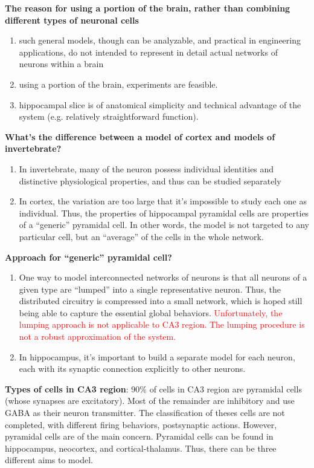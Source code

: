 {\bf The reason for using a portion of the brain, rather than
  combining different types of neuronal cells}
\begin{enumerate}
\item such general models, though can be analyzable, and practical in
  engineering applications, do not intended to represent in detail
  actual networks of neurons within a brain
\item using a portion of the brain, experiments are feasible. 
\item hippocampal slice is of anatomical simplicity and technical
  advantage of the system (e.g. relatively straightforward function).
\end{enumerate}

{\bf What's the difference between a model of cortex and models of
invertebrate?}
\begin{enumerate}
\item In invertebrate, many of the neuron possess individual
  identities and distinctive physiological properties, and thus can be
  studied separately 
\item In cortex, the variation are too large that it's impossible to
  study each one as individual. Thus, the properties of hippocampal
  pyramidal cells are properties of a ``generic'' pyramidal cell. In
  other words, the model is not targeted to any particular cell, but
  an ``average'' of the cells in the whole network. 
\end{enumerate}

{\bf Approach for ``generic'' pyramidal cell?}
\begin{enumerate}
\item One way to model interconnected networks of neurons is that all
  neurons of a given type are ``lumped'' into a single representative
  neuron. Thus, the distributed circuitry is compressed into a small
  network, which is hoped still being able to capture the essential
  global behaviors.
  \textcolor{red}{Unfortunately, the lumping approach is not
    applicable to CA3 region. The lumping procedure is not a robust
    approximation of the system.}
\item In hippocampus, it's important to build a separate model for
  each neuron, each with its synaptic connection explicitly to other
  neurons.
\end{enumerate}

{\bf Types of cells in CA3 region}: 90\% of cells in CA3 region are
pyramidal cells (whose synapses are excitatory). Most of the remainder
are inhibitory and use GABA as their neuron transmitter.  The
classification of theses cells are not completed, with different
firing behaviors, postsynaptic actions. However, pyramidal cells are
of the main concern.  Pyramidal cells can be found in hippocampus,
neocortex, and cortical-thalamus. Thus, there can be three different
aims to model.

